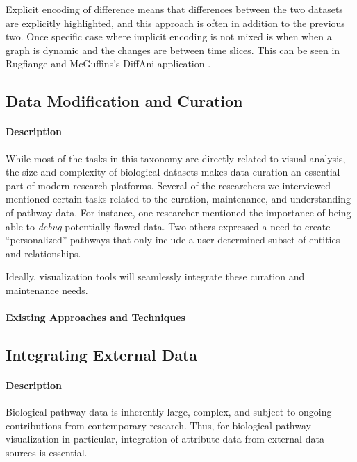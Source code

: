 Explicit encoding of difference  means that differences between the two datasets are explicitly highlighted, and this approach is often in addition to the previous two.
Once specific case where implicit encoding is not mixed is when when a graph is dynamic and the changes are between time slices.
This can be seen in Rugfiange and McGuffins's DiffAni application \cite{Rufiange2013}.

\subsection*{Data Modification and Curation}

\paragraph*{Description}

While most of the tasks in this taxonomy are directly related to visual analysis, the size and complexity of biological datasets makes data curation an essential part of modern research platforms.
Several of the researchers we interviewed mentioned certain tasks related to the curation, maintenance, and understanding of pathway data.
For instance, one researcher mentioned the importance of being able to \emph{debug} potentially flawed data.
Two others expressed a need to create ``personalized'' pathways that only include a user-determined subset of entities and relationships.

Ideally, visualization tools will seamlessly integrate these curation and maintenance needs.

\paragraph*{Existing Approaches and Techniques}

\subsection*{Integrating External Data}

\paragraph*{Description}

Biological pathway data is inherently large, complex, and subject to ongoing contributions from contemporary research.
Thus, for biological pathway visualization in particular, integration of attribute data from external data sources is essential.

